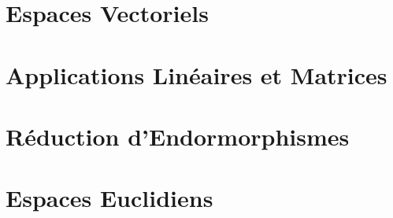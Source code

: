



\chapter{Espaces Vectoriels}


\chapter{Applications Linéaires et Matrices}


\chapter{Réduction d'Endormorphismes}


\chapter{Espaces Euclidiens}
